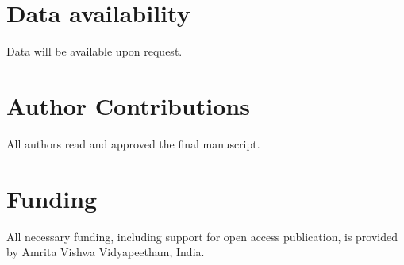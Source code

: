 \documentclass[pdflatex,sn-mathphys-num]{sn-jnl}%
\theoremstyle{thmstyleone}%
\theoremstyle{thmstyletwo}%
\theoremstyle{thmstylethree}%
\begin{document}
\section{Data availability}
Data will be available upon request.

\section{Author Contributions}
All authors read and approved the final manuscript.

\section{Funding}
All necessary funding, including support for open access publication, is provided by Amrita Vishwa Vidyapeetham, India.


\end{document}
